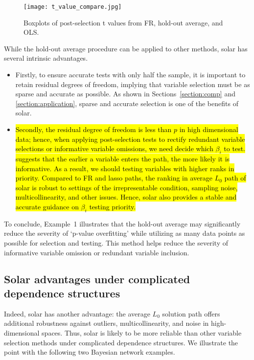 \documentclass[11pt,review,authoryear]{elsarticle}
\begin{document}
\begin{figure}[h]
%
  \centering
%
  \texttt{[image: t\_value\_compare.jpg]}
%
  \caption{Boxplots of post-selection t values from FR, hold-out average, and OLS.}
%
  \label{fig:t_value_compare}
%
\end{figure}

While the hold-out average procedure can be applied to other methods, solar has several intrinsic advantages. 

\begin{itemize}
  \item Firstly, to ensure accurate tests with only half the sample, it is important to retain residual degrees of freedom, implying that variable selection must be as sparse and accurate as possible. As shown in Sections~\ref{section:comp} and \ref{section:application}, sparse and accurate selection is one of the benefits of solar. 
  \item \hl{Secondly, the residual degree of freedom is less than $p$ in high dimensional data; hence, when applying post-selection tests to rectify redundant variable selections or informative variable omissions, we need decide which $\beta_i$ to test.} \citet[Theorem~2]{zhang09} \hl{suggests that the earlier a variable enters the path, the more likely it is informative. As a result, we should testing variables with higher ranks in priority. Compared to FR and lasso paths, the ranking in average $L_0$ path of solar is robust to settings of the irrepresentable condition, sampling noise, multicollinearity, and other issues. Hence, solar also provides a stable and accurate guidance on $\beta_i$ testing priority.}
\end{itemize}

To conclude, Example~1 illustrates that the hold-out average may significantly reduce the severity of `p-value overfitting' while utilizing as many data points as possible for selection and testing. This method helps reduce the severity of informative variable omission or redundant variable inclusion. 

\subsection{Solar advantages under complicated dependence structures\label{section:example}}

Indeed, solar has another advantage: the average $L_0$ solution path offers additional robustness against outliers, multicollinearity, and noise in high-dimensional spaces. Thus, solar is likely to be more reliable than other variable selection methods under complicated dependence structures. We illustrate the point with the following two Bayesian network examples.
\end{document}
